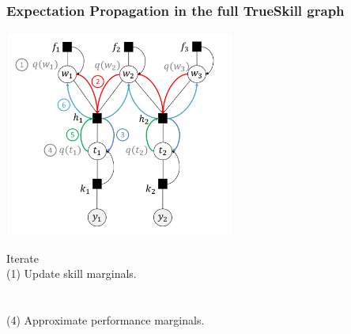 \begin{frame}
\frametitle{Expectation Propagation in the full TrueSkill graph}

\parbox{0.55\textwidth}{
\includegraphics[trim=0.7cm 0.1cm 0.1cm 0.8cm, clip=true, width=0.57\textwidth]{TrueSkillFullEP2}
}
\parbox{0.44\textwidth}{\footnotesize
Iterate\\

(1) Update skill marginals.\\

\\

\\

(4) Approximate performance marginals.\\

\\

}
\end{frame}


